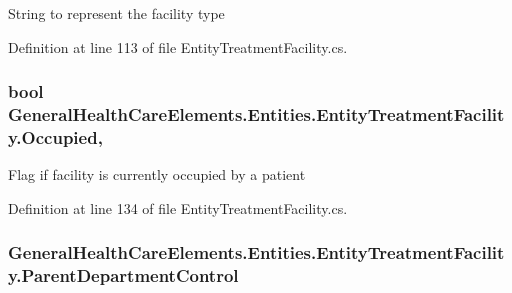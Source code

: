 String to represent the facility type 



Definition at line 113 of file Entity\+Treatment\+Facility.\+cs.

\subsubsection[{\texorpdfstring{Occupied}{Occupied}}]{\setlength{\rightskip}{0pt plus 5cm}bool General\+Health\+Care\+Elements.\+Entities.\+Entity\+Treatment\+Facility.\+Occupied\hspace{0.3cm}{\ttfamily [get]}, {\ttfamily [set]}}\hypertarget{class_general_health_care_elements_1_1_entities_1_1_entity_treatment_facility_ac089914fbf7bde2638c7b582d8e9c178}{}\label{class_general_health_care_elements_1_1_entities_1_1_entity_treatment_facility_ac089914fbf7bde2638c7b582d8e9c178}


Flag if facility is currently occupied by a patient 



Definition at line 134 of file Entity\+Treatment\+Facility.\+cs.

\subsubsection[{\texorpdfstring{Parent\+Department\+Control}{ParentDepartmentControl}}]{ General\+Health\+Care\+Elements.\+Entities.\+Entity\+Treatment\+Facility.\+Parent\+Department\+Control\hspace{0.3cm}{\ttfamily [get]}}\hypertarget{class_general_health_care_elements_1_1_entities_1_1_entity_treatment_facility_a52576742da857060465cfb050cb0d30e}{}\label{class_general_health_care_elements_1_1_entities_1_1_entity_treatment_facility_a52576742da857060465cfb050cb0d30e}


